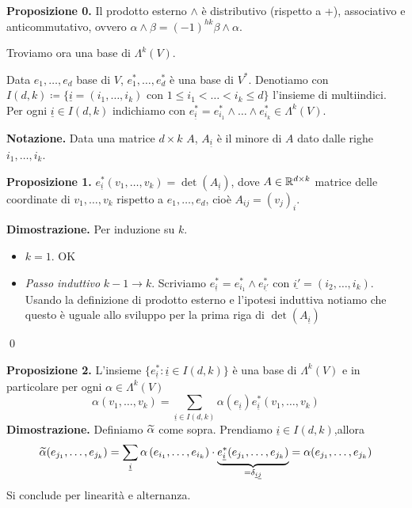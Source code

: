 \textbf{Proposizione 0.} Il prodotto esterno $\wedge$ è distributivo (rispetto a +), associativo e anticommutativo, ovvero $\alpha \wedge \beta = (-1)^{hk} \beta \wedge \alpha$.

\vss

Troviamo ora una base di $\Lambda^k(V)$.

Data $e_1,\ldots,e_d$ base di $V$, $e_1^*,\ldots,e_d^*$ è una base di $V^*$.
Denotiamo con $I(d,k) \coloneqq \{ \underline{i} = (i_1,\ldots,i_k) \text{ con } 1 \leq i_1 < \ldots < i_k \leq d \}$ l'insieme di multiindici.
Per ogni $\underline{i} \in I(d,k)$ indichiamo con $e_{\underline{i}}^* = e_{i_1}^* \wedge \ldots \wedge e_{i_k}^* \in \Lambda^k(V)$. 

\textbf{Notazione.} Data una matrice $d \times k$ $A$, $A_{\underline{i}}$ è il minore di $A$ dato dalle righe $i_1,\ldots,i_k$.

\textbf{Proposizione 1.} $e_{\underline{i}}^* (v_1,\ldots,v_k) = \det(A_{\underline{i}})$, dove $A \in \mathbb R^{d\times k}$ matrice delle coordinate di $v_1,\ldots,v_k$ rispetto a $e_1,\ldots,e_d$, cioè $A_{ij} = (v_j)_i$.

\textbf{Dimostrazione.} Per induzione su $k$.
\begin{itemize}

	\item $k=1$. OK

	\item \textit{Passo induttivo} $k-1 \to k$. Scriviamo $e_{\underline{i}}^* = e^*_{i_1} \wedge e^*_{\underline{i'}}$ con $\underline{i'} = (i_2,\ldots,i_k)$.
	Usando la definizione di prodotto esterno e l'ipotesi induttiva notiamo che questo è uguale allo sviluppo per la prima riga di $\det(A_{\underline{i}})$

\end{itemize}
\qed

\textbf{Proposizione 2.} L'insieme $\{e^*_{\underline{i}} \colon \underline{i} \in I(d,k) \}$ è una base di $\Lambda^k(V)$ e in particolare per ogni $\alpha \in \Lambda^k(V)$
%
$$
	\alpha(v_1,\ldots,v_k) = \sum_{\underline{i} \in I(d,k)} \alpha(e_{\underline{i}}) e_{\underline{i}}^* (v_1,\ldots,v_k)
$$
%
\textbf{Dimostrazione.} Definiamo $\widetilde{\alpha}$ come sopra. Prendiamo $\underline{i} \in I(d,k)$,allora
%
$$
\widetilde{\alpha}(e_{j_1},\ldots,e_{j_k}) = \sum_{\underline{i}} \alpha \left( e_{i_1},\ldots,e_{i_k} \right) \cdot \underbrace{e_{\underline{i}}^* (e_{j_1},\ldots,e_{j_k})}_{= \delta_{\underline{i}\underline{j}}} = \alpha (e_{j_1},\ldots,e_{j_k})
$$
%
Si conclude per linearità e alternanza.

